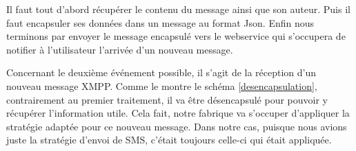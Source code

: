 Il faut tout d'abord récupérer le contenu du message ainsi que son auteur. Puis il faut encapsuler 
ses données dans un message au format Json. Enfin nous terminons par envoyer le message encapsulé vers 
le webservice qui s'occupera de notifier à l'utilisateur l'arrivée d'un nouveau message.
 
Concernant le deuxième événement possible, il s'agit de la réception d'un nouveau message XMPP. Comme le
montre le schéma \ref{desencapsulation}, contrairement au premier traitement, il va être désencapsulé pour 
pouvoir y récupérer l'information utile. Cela fait, notre fabrique va s'occuper d'appliquer la stratégie 
adaptée pour ce nouveau message. Dans notre cas, puisque nous avions juste la stratégie d'envoi de SMS, c'était toujours celle-ci qui était appliquée.